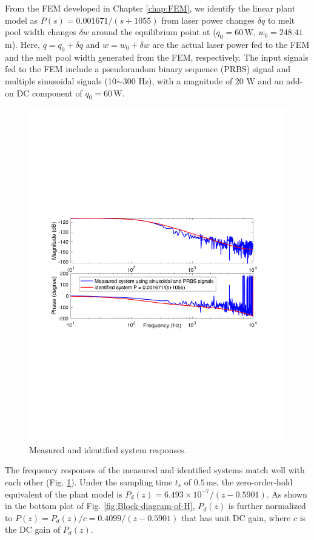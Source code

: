 \documentclass [11pt, proquest] {uwthesis}[2020/02/24]
\begin{document}
From the FEM developed in Chapter \ref{chap:FEM}, we identify the linear plant model as $P(s)=0.001671/(s+1055)$
from laser power changes $\delta q$ to melt pool width changes $\delta w$
around the equilibrium point at ($q_{0}=60\,\text{W},\,$$w_{0}=248.41\,$\textmu m).
Here, $q=q_{0}+\delta q$ and $w=w_{0}+\delta w$ are the actual laser
power fed to the FEM and the melt pool width generated from the FEM,
respectively. The input signals fed to the FEM include a pseudorandom
binary sequence (PRBS) signal and multiple sinusoidal signals (10$\sim$300
Hz), with a magnitude of 20 W and an add-on DC component of $q_{0}=60\,\text{W}$.
\begin{figure}[!ht]
\begin{centering}
\includegraphics[clip,width=13cm]{Hammerstein/systemid_measured_identified_systems}
\par\end{centering}
\centering{}\caption{\label{fig:Measured-and-identified-H}Measured and identified system
responses.}
\end{figure}
The frequency responses of the measured and identified systems match
well with each other (Fig. \ref{fig:Measured-and-identified-H}). Under
the sampling time $t_{s}$ of $0.5\,\text{ms}$, the zero-order-hold
equivalent of the plant model is $P_{d}(z)=6.493\times10^{-7}/(z-0.5901)$.
As shown in the bottom plot of Fig. \ref{fig:Block-diagram-of-H}, $P_{d}(z)$
is further normalized to $P(z)=P_{d}(z)/c=0.4099/(z-0.5901)$ that
has unit DC gain, where $c$ is the DC gain of $P_{d}(z)$.
\end{document}
